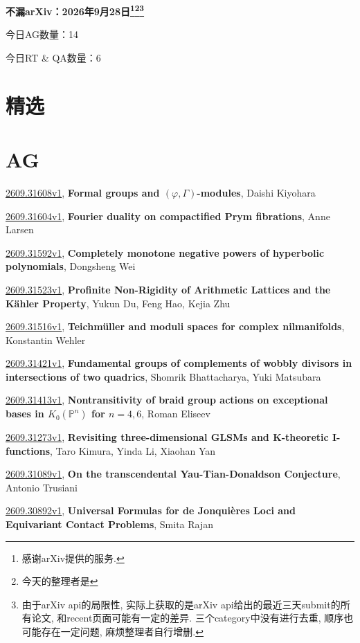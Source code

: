 \documentclass[9pt, a4paper]{article}
\theoremstyle{plain}
\theoremstyle{definition}
\theoremstyle{remark}
\newcommand{\arxiv}[3]{\href{https://arxiv.org/abs/#1}{#1}, \textbf{\textcolor{arxivblue}{#2}}, #3}
\newcommand{\AGnumber}{14}
\newcommand{\RTQAnumber}{6}
\newcommand{\NewestDate}{2026年9月28日}
\newcommand{\todayarXiver}{} %
\begin{document}
\begin{center}
    \Huge\textbf{不漏arXiv：\NewestDate\footnote{感谢arXiv提供的服务.}\footnote{今天的整理者是\todayarXiver}\footnote{由于arXiv api的局限性, 实际上获取的是arXiv api给出的最近三天submit的所有论文, 和recent页面可能有一定的差异. 三个category中没有进行去重, 顺序也可能存在一定问题, 麻烦整理者自行增删.}} \\
\end{center}

\setcounter{section}{-1}

\begin{center}
    今日AG数量：\AGnumber
    
    今日RT \& QA数量：\RTQAnumber
    
\end{center}


\section{精选}


\section{AG}
\arxiv{2609.31608v1}{Formal groups and $(\varphi,Γ)$-modules}{Daishi Kiyohara}

\arxiv{2609.31604v1}{Fourier duality on compactified Prym fibrations}{Anne Larsen}

\arxiv{2609.31592v1}{Completely monotone negative powers of hyperbolic polynomials}{Dongsheng Wei}

\arxiv{2609.31523v1}{Profinite Non-Rigidity of Arithmetic Lattices and the Kähler Property}{Yukun Du, Feng Hao, Kejia Zhu}

\arxiv{2609.31516v1}{Teichmüller and moduli spaces for complex nilmanifolds}{Konstantin Wehler}

\arxiv{2609.31421v1}{Fundamental groups of complements of wobbly divisors in intersections of two quadrics}{Shomrik Bhattacharya, Yuki Matsubara}

\arxiv{2609.31413v1}{Nontransitivity of braid group actions on exceptional bases in $K_0(\mathbb{P}^n)$ for $n=4,6$}{Roman Eliseev}

\arxiv{2609.31273v1}{Revisiting three-dimensional GLSMs and K-theoretic I-functions}{Taro Kimura, Yinda Li, Xiaohan Yan}

\arxiv{2609.31089v1}{On the transcendental Yau-Tian-Donaldson Conjecture}{Antonio Trusiani}

\arxiv{2609.30892v1}{Universal Formulas for de Jonquières Loci and Equivariant Contact Problems}{Smita Rajan}
\end{document}
